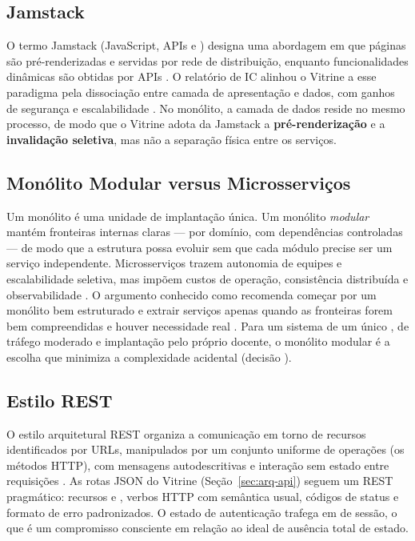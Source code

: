 \subsection{Jamstack}

O termo Jamstack (JavaScript, APIs e ) designa uma abordagem em que páginas são pré-renderizadas e servidas por rede de distribuição, enquanto funcionalidades dinâmicas são obtidas por APIs \cite{biilmann2019jamstack}. O relatório de IC alinhou o Vitrine a esse paradigma pela dissociação entre camada de apresentação e dados, com ganhos de segurança e escalabilidade \cite{reis2026ic}. No monólito, a camada de dados reside no mesmo processo, de modo que o Vitrine adota da Jamstack a \textbf{pré-renderização} e a \textbf{invalidação seletiva}, mas não a separação física entre os serviços.

\subsection{Monólito Modular versus Microsserviços}\label{sec:fund-monolito}

Um monólito é uma unidade de implantação única. Um monólito \emph{modular} mantém fronteiras internas claras --- por domínio, com dependências controladas --- de modo que a estrutura possa evoluir sem que cada módulo precise ser um serviço independente. Microsserviços trazem autonomia de equipes e escalabilidade seletiva, mas impõem custos de operação, consistência distribuída e observabilidade \cite{newman2019monolith}. O argumento conhecido como  recomenda começar por um monólito bem estruturado e extrair serviços apenas quando as fronteiras forem bem compreendidas e houver necessidade real \cite{fowler2015monolithfirst}. Para um sistema de um único , de tráfego moderado e implantação pelo próprio docente, o monólito modular é a escolha que minimiza a complexidade acidental (decisão ).

\subsection{Estilo REST}

O estilo arquitetural REST organiza a comunicação em torno de recursos identificados por URLs, manipulados por um conjunto uniforme de operações (os métodos HTTP), com mensagens autodescritivas e interação sem estado entre requisições \cite{fielding2000rest}. As rotas JSON do Vitrine (Seção~\ref{sec:arq-api}) seguem um REST pragmático: recursos  e , verbos HTTP com semântica usual, códigos de status e formato de erro padronizados. O estado de autenticação trafega em  de sessão, o que é um compromisso consciente em relação ao ideal de ausência total de estado.

